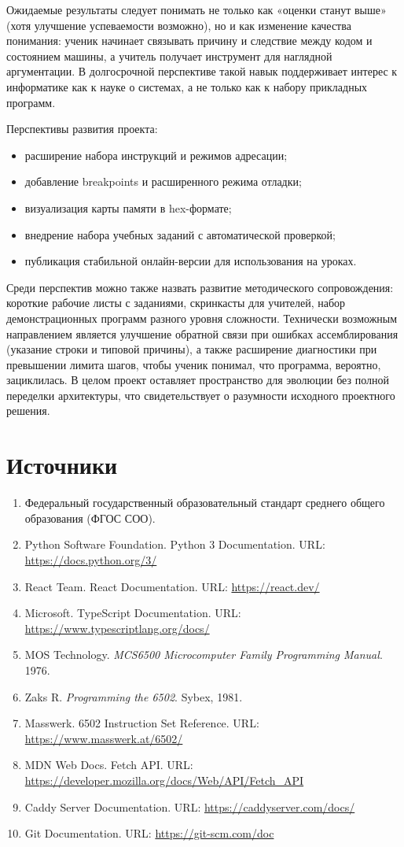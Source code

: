 \documentclass[12pt,a4paper]{article}
\begin{document}
Ожидаемые результаты следует понимать не только как «оценки станут выше» (хотя улучшение успеваемости возможно), но и как изменение качества понимания: ученик начинает связывать причину и следствие между кодом и состоянием машины, а учитель получает инструмент для наглядной аргументации. В долгосрочной перспективе такой навык поддерживает интерес к информатике как к науке о системах, а не только как к набору прикладных программ.

Перспективы развития проекта:
\begin{itemize}
  \item расширение набора инструкций и режимов адресации;
  \item добавление breakpoints и расширенного режима отладки;
  \item визуализация карты памяти в hex-формате;
  \item внедрение набора учебных заданий с автоматической проверкой;
  \item публикация стабильной онлайн-версии для использования на уроках.
\end{itemize}

Среди перспектив можно также назвать развитие методического сопровождения: короткие рабочие листы с заданиями, скринкасты для учителей, набор демонстрационных программ разного уровня сложности. Технически возможным направлением является улучшение обратной связи при ошибках ассемблирования (указание строки и типовой причины), а также расширение диагностики при превышении лимита шагов, чтобы ученик понимал, что программа, вероятно, зациклилась. В целом проект оставляет пространство для эволюции без полной переделки архитектуры, что свидетельствует о разумности исходного проектного решения.

\newpage
\section{Источники}

\begin{enumerate}
  \item Федеральный государственный образовательный стандарт среднего общего образования (ФГОС СОО).
  \item Python Software Foundation. Python 3 Documentation. URL: \url{https://docs.python.org/3/} 
  \item React Team. React Documentation. URL: \url{https://react.dev/} 
  \item Microsoft. TypeScript Documentation. URL: \url{https://www.typescriptlang.org/docs/} 
  \item MOS Technology. \textit{MCS6500 Microcomputer Family Programming Manual}. 1976.
  \item Zaks R. \textit{Programming the 6502}. Sybex, 1981.
  \item Masswerk. 6502 Instruction Set Reference. URL: \url{https://www.masswerk.at/6502/} 
  \item MDN Web Docs. Fetch API. URL: \url{https://developer.mozilla.org/docs/Web/API/Fetch_API} 
  \item Caddy Server Documentation. URL: \url{https://caddyserver.com/docs/} 
  \item Git Documentation. URL: \url{https://git-scm.com/doc} 
\end{enumerate}
\end{document}
